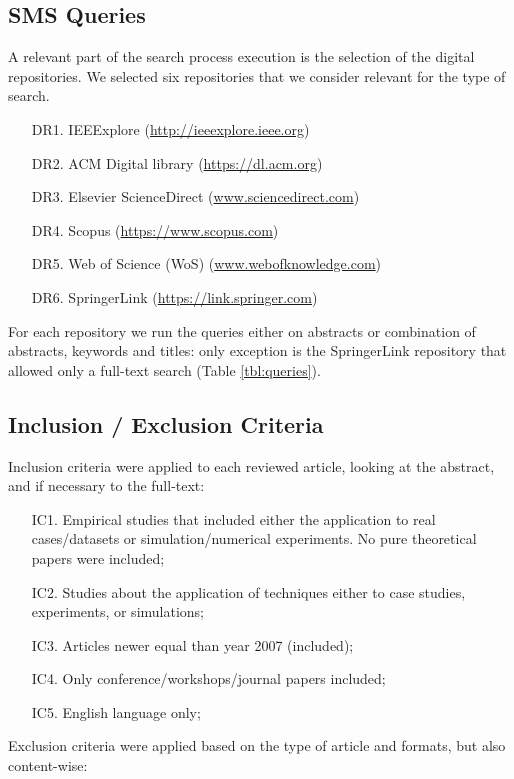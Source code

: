 \documentclass[journal]{IEEEtran}
\begin{document}
\subsection{SMS Queries}
A relevant part of the search process execution is the selection of the digital repositories. We selected six repositories that we consider relevant for the type of search.
\begin{enumerate}
\item[{DR}1.] IEEExplore (\url{http://ieeexplore.ieee.org})
\item[{DR}2.] ACM Digital library (\url{https://dl.acm.org})
\item[{DR}3.] Elsevier ScienceDirect (\url{www.sciencedirect.com}) 
\item[{DR}4.] Scopus (\url{https://www.scopus.com})
\item[{DR}5.] Web of Science (WoS) (\url{www.webofknowledge.com})
\item[{DR}6.] SpringerLink (\url{https://link.springer.com})
\end{enumerate}

For each repository we run the queries either on abstracts or combination of abstracts, keywords and titles: only exception is the SpringerLink repository that allowed only a full-text search (Table \ref{tbl:queries}).

\subsection{Inclusion / Exclusion Criteria}

Inclusion criteria were applied to each reviewed article, looking at the abstract, and if necessary to the full-text:

\begin{enumerate}
\item[{IC}1.] Empirical studies that included either the application to real cases/datasets or simulation/numerical experiments. No pure theoretical papers were included;
\item[{IC}2.] Studies about the application of techniques either to case studies, experiments, or simulations;
\item[{IC}3.] Articles newer equal than year 2007 (included);
\item[{IC}4.] Only conference/workshops/journal papers included;
\item[{IC}5.] English language only;
\end{enumerate}

\noindent Exclusion criteria were applied based on the type of article and formats, but also content-wise:
\end{document}
